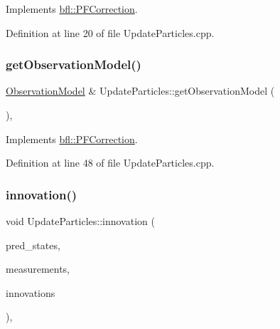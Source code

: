 Implements \mbox{\hyperlink{classbfl_1_1PFCorrection_a3fb61b90d36bea3271c1c9e363c61229}{bfl\+::\+P\+F\+Correction}}.



Definition at line 20 of file Update\+Particles.\+cpp.

\mbox{\label{classbfl_1_1UpdateParticles_a673781f8cadbd148cb9a67a3f8532b37}} 
\subsubsection{\texorpdfstring{get\+Observation\+Model()}{getObservationModel()}}
{\footnotesize\ttfamily \mbox{\hyperlink{classbfl_1_1ObservationModel}{Observation\+Model}} \& Update\+Particles\+::get\+Observation\+Model (\begin{DoxyParamCaption}{ }\end{DoxyParamCaption})\hspace{0.3cm}{\ttfamily [override]}, {\ttfamily [virtual]}}



Implements \mbox{\hyperlink{classbfl_1_1PFCorrection_a3bc4010f306825d69014bee53cd262ad}{bfl\+::\+P\+F\+Correction}}.



Definition at line 48 of file Update\+Particles.\+cpp.

\mbox{\label{classbfl_1_1UpdateParticles_a8eb8aa7a1cbcf1b285401bc2b0dbed3e}} 
\subsubsection{\texorpdfstring{innovation()}{innovation()}}
{\footnotesize\ttfamily void Update\+Particles\+::innovation (\begin{DoxyParamCaption}\item[{const Eigen\+::\+Ref$<$ const Eigen\+::\+Matrix\+Xf $>$ \&}]{pred\+\_\+states,  }\item[{const Eigen\+::\+Ref$<$ const Eigen\+::\+Matrix\+Xf $>$ \&}]{measurements,  }\item[{Eigen\+::\+Ref$<$ Eigen\+::\+Matrix\+Xf $>$}]{innovations }\end{DoxyParamCaption})\hspace{0.3cm}{\ttfamily [override]}, {\ttfamily [virtual]}}



